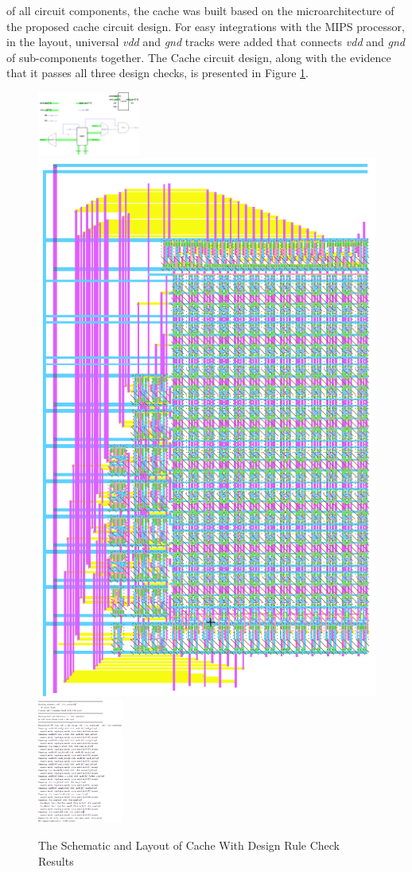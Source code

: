 \documentclass[conference]{IEEEtran}
\begin{document}
 of all circuit components, the cache was built based on the microarchitecture of the proposed cache circuit design. For easy integrations with the MIPS processor, in the layout, universal \textit{vdd} and \textit{gnd} tracks were added that connects \textit{vdd} and \textit{gnd} of sub-components together. The Cache circuit design, along with the evidence that it passes all three design checks, is presented in Figure \ref{fig:cache}.

\begin{figure}[h!]
  \centering
    \includegraphics[width=0.3\textwidth]{cache_sch} \includegraphics[scale=0.3]{cache_lay} \includegraphics[width=0.25\textwidth]{cache_check}
  \caption{The Schematic and Layout of Cache With Design Rule Check Results}
  \label{fig:cache}
\end{figure}
\end{document}
